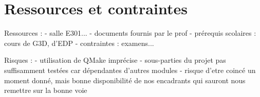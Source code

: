 \documentclass[12pt]{article}
\begin{document}
\section{Ressources et contraintes}

Ressources :
- salle E301...
- documents fournis par le prof
- prérequis scolaires : cours de G3D, d'EDP
- contraintes : examens...

Risques :
- utilisation de QMake imprécise
- sous-parties du projet pas suffisamment testées car dépendantes d'autres modules
- risque d'etre coincé un moment donné, mais bonne disponibilité de nos encadrants qui sauront nous remettre sur la bonne voie
\end{document}
